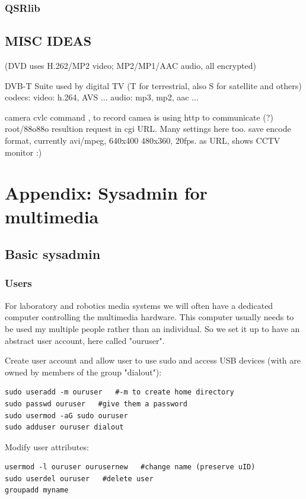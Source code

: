 \documentclass[oneside,english]{scrbook}
\begin{document}
\section{QSRlib}

\chapter{MISC IDEAS}



(DVD uses H.262/MP2 video;  MP2/MP1/AAC audio, all encrypted)

DVB-T Suite used by digital TV (T for terrestrial, also S for satellite and others)
	codecs:
		video: h.264, AVS ...
		audio: mp3, mp2, aac ...


camera cvlc command , to record
	camea is using http to communicate (?) root/88o88o
	resultion request in cgi URL.  Many settings here too.
	save encode format, currently avi/mpeg, 640x400
	480x360, 20fps.
	as URL, shows CCTV monitor :)

\part{Appendix: Sysadmin for multimedia}

\chapter{Basic sysadmin}

\section{Users}
For laboratory and robotics media systems we will often have a dedicated computer controlling the multimedia hardware.  This computer usually needs to be used my multiple people rather than an individual.   So we set it up to have an abstract user account, here called "ouruser".

Create user account and allow user to use sudo and access USB devices (with are owned by members of the group "dialout"):
\begin{lstlisting}
sudo useradd -m ouruser   #-m to create home directory
sudo passwd ouruser   #give them a password
sudo usermod -aG sudo ouruser
sudo adduser ouruser dialout
\end{lstlisting}

Modify user attributes:
\begin{lstlisting}
usermod -l ouruser ourusernew   #change name (preserve uID)
sudo userdel ouruser   #delete user
groupadd myname
\end{lstlisting}
\end{document}
